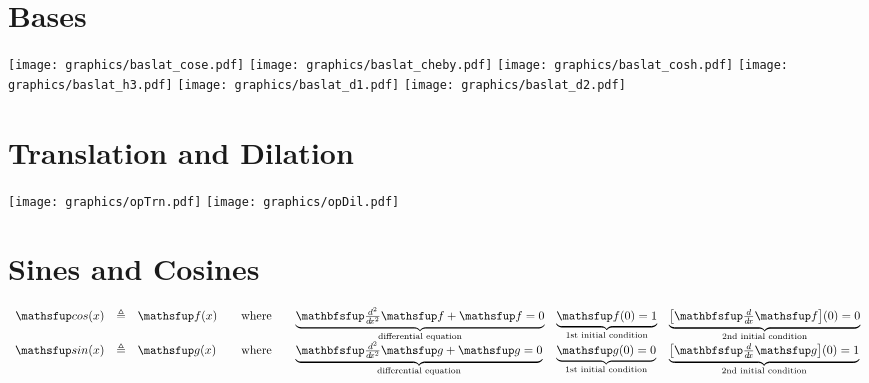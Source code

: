 %  

\section*{Bases}
\texttt{[image: graphics/baslat\_cose.pdf]}  \newpage
\texttt{[image: graphics/baslat\_cheby.pdf]} \newpage
\texttt{[image: graphics/baslat\_cosh.pdf]}  \newpage
\texttt{[image: graphics/baslat\_h3.pdf]}    \newpage
\texttt{[image: graphics/baslat\_d1.pdf]}    \newpage
\texttt{[image: graphics/baslat\_d2.pdf]}    \newpage


\section*{Translation and Dilation}
\texttt{[image: graphics/opTrn.pdf]}\hspace{20mm}
\texttt{[image: graphics/opDil.pdf]}

\section*{Sines and Cosines}
      \[\begin{array}{rcl @{\qquad}c@{\qquad} lll}
        \cos(x) &\eqd& \ff(x)
          & \text{where} 
          & \mcom{\brn{\opDiff\ff}+ \ff=0}{differential equation}  
          & \mcom{\ff(0)=1           }{1st initial condition}
          & \mcom{\brs{\opDif\ff}(0)=0 }{2nd initial condition}
        \\
        \sin(x) &\eqd& \fg(x)
          & \text{where} 
          & \mcom{\brn{\opDiff\fg}+ \fg=0}{differential equation}  
          & \mcom{\fg(0)=0           }{1st initial condition}
          & \mcom{\brs{\opDif\fg}(0)=1 }{2nd initial condition}
      \end{array}\]

